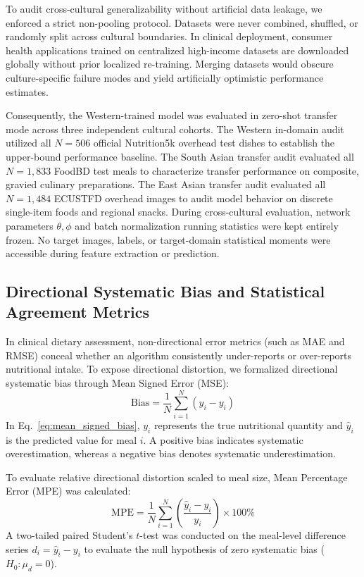 \documentclass[utf8]{FrontiersinVancouver}
\begin{document}
To audit cross-cultural generalizability without artificial data leakage, we enforced a strict non-pooling protocol. Datasets were never combined, shuffled, or randomly split across cultural boundaries. In clinical deployment, consumer health applications trained on centralized high-income datasets are downloaded globally without prior localized re-training. Merging datasets would obscure culture-specific failure modes and yield artificially optimistic performance estimates.

Consequently, the Western-trained model was evaluated in zero-shot transfer mode across three independent cultural cohorts. The Western in-domain audit utilized all $N=506$ official Nutrition5k overhead test dishes to establish the upper-bound performance baseline. The South Asian transfer audit evaluated all $N=1,833$ FoodBD test meals to characterize transfer performance on composite, gravied culinary preparations. The East Asian transfer audit evaluated all $N=1,484$ ECUSTFD overhead images to audit model behavior on discrete single-item foods and regional snacks.
During cross-cultural evaluation, network parameters $\theta, \phi$ and batch normalization running statistics were kept entirely frozen. No target images, labels, or target-domain statistical moments were accessible during feature extraction or prediction.

\subsection{Directional Systematic Bias and Statistical Agreement Metrics}

In clinical dietary assessment, non-directional error metrics (such as MAE and RMSE) conceal whether an algorithm consistently under-reports or over-reports nutritional intake. To expose directional distortion, we formalized directional systematic bias through Mean Signed Error (MSE):
\begin{equation}
    \label{eq:mean_signed_bias}
    \text{Bias} = \frac{1}{N} \sum_{i=1}^N \left( \hat{y}_i - y_i \right)
\end{equation}
In Eq.~\ref{eq:mean_signed_bias}, $y_i$ represents the true nutritional quantity and $\hat{y}_i$ is the predicted value for meal $i$. A positive bias indicates systematic overestimation, whereas a negative bias denotes systematic underestimation.

To evaluate relative directional distortion scaled to meal size, Mean Percentage Error (MPE) was calculated:
\begin{equation}
    \label{eq:mpe}
    \text{MPE} = \frac{1}{N} \sum_{i=1}^N \left( \frac{\hat{y}_i - y_i}{y_i} \right) \times 100\%
\end{equation}
A two-tailed paired Student's $t$-test was conducted on the meal-level difference series $d_i = \hat{y}_i - y_i$ to evaluate the null hypothesis of zero systematic bias ($H_0: \mu_d = 0$).
\end{document}
